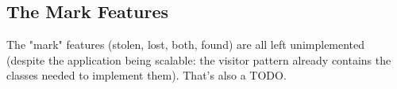 \subsection{The Mark Features}
The "mark" features (stolen, lost, both, found) are all left unimplemented (despite the application being scalable: the visitor pattern already contains the classes needed to implement them). That's also a TODO.